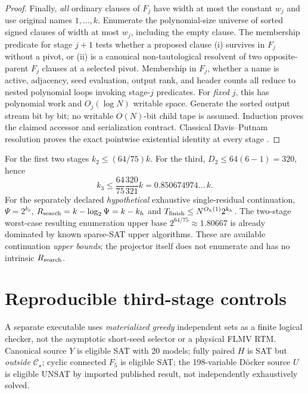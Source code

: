 \documentclass[11pt]{article}
\newcommand{\CS}{\mathcal C_{\star}}
\begin{document}
\begin{proof}
Finally, \emph{all} ordinary clauses of \(F_j\) have width at most the constant \(w_j\) and use original names \(1,\ldots,k\).  Enumerate the polynomial-size universe of sorted signed clauses of width at most \(w_j\), including the empty clause.  The membership predicate for stage \(j+1\) tests whether a proposed clause (i) survives in \(F_j\) without a pivot, or (ii) is a canonical non-tautological resolvent of two opposite-parent \(F_j\) clauses at a selected pivot.  Membership in \(F_j\), whether a name is active, adjacency, seed evaluation, output rank, and header counts all reduce to nested polynomial loops invoking stage-\(j\) predicates.  For \emph{fixed} \(j\), this has polynomial work and \(O_j(\log N)\) writable space.  Generate the sorted output stream bit by bit; no writable \(O(N)\)-bit child tape is assumed.  Induction proves the claimed accessor and serialization contract.  Classical Davis--Putnam resolution proves the exact pointwise existential identity at every stage \cite{dp}.
\end{proof}

For the first two stages \(k_2\le(64/75)k\).  For the third, \(D_2\le64(6-1)=320\), hence
\[
 k_3\le \frac{64}{75}\frac{320}{321}k
 =0.850674974\ldots\,k.
\]
For the separately declared \emph{hypothetical} exhaustive single-residual continuation, \(\Psi=2^{k_h}\), \(R_{\rm search}=k-\log_2\Psi=k-k_h\) and \(T_{\rm finish}\le N^{O_h(1)}2^{k_h}\).  The two-stage worst-case resulting enumeration upper base \(2^{64/75}\approx1.80667\) is already dominated by known sparse-SAT upper algorithms.  These are available continuation \emph{upper bounds}; the projector itself does not enumerate and has no intrinsic \(R_{\rm search}\).

\section{Reproducible third-stage controls}
A separate executable uses \emph{materialized greedy} independent sets as a finite logical checker, not the asymptotic short-seed selector or a physical FLMV RTM.  Canonical source \(Y\) is eligible SAT with 20 models; fully paired \(H\) is SAT but \emph{outside} \(\CS\); cyclic connected \(F_5\) is eligible SAT; the 198-variable D\"ocker source \(U\) is eligible UNSAT by imported published result, not independently exhaustively solved.
\end{document}
